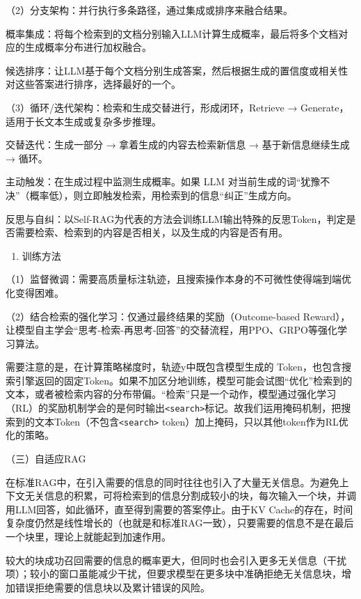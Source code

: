 （2）分支架构：并行执行多条路径，通过集成或排序来融合结果。

概率集成：将每个检索到的文档分别输入LLM计算生成概率，最后将多个文档对应的生成概率分布进行加权融合。

候选排序：让LLM基于每个文档分别生成答案，然后根据生成的置信度或相关性对这些答案进行排序，选择最好的一个。

（3）循环/迭代架构：检索和生成交替进行，形成闭环，Retrieve → Generate，适用于长文本生成或复杂多步推理。

交替迭代：生成一部分 → 拿着生成的内容去检索新信息 → 基于新信息继续生成 → 循环。

主动触发：在生成过程中监测生成概率。如果 LLM 对当前生成的词``犹豫不决''（概率低），则立即触发检索，用检索到的信息``纠正''生成方向。

反思与自纠：以Self-RAG为代表的方法会训练LLM输出特殊的反思Token，判定是否需要检索、检索到的内容是否相关，以及生成的内容是否有用。

\begin{enumerate}
\def\labelenumi{\arabic{enumi}.}
\setcounter{enumi}{1}
\tightlist
\item
  训练方法
\end{enumerate}

（1）监督微调：需要高质量标注轨迹，且搜索操作本身的不可微性使得端到端优化变得困难。

（2）结合检索的强化学习：仅通过最终结果的奖励（Outcome-based Reward），让模型自主学会``思考-检索-再思考-回答''的交替流程，用PPO、GRPO等强化学习算法。

需要注意的是，在计算策略梯度时，轨迹y中既包含模型生成的 Token，也包含搜索引擎返回的固定Token。如果不加区分地训练，模型可能会试图``优化''检索到的文本，或者被检索内容的分布带偏。``检索''只是一个动作，模型通过强化学习（RL）的奖励机制学会的是何时输出\texttt{\textless{}search\textgreater{}}标记。故我们运用掩码机制，把搜索到的文本Token（不包含\texttt{\textless{}search\textgreater{}} token）加上掩码，只以其他token作为RL优化的策略。

（三）自适应RAG

在标准RAG中，在引入需要的信息的同时往往也引入了大量无关信息。为避免上下文无关信息的积累，可将检索到的信息分割成较小的块，每次输入一个块，并调用LLM回答，如此循环，直至得到需要的答案停止。由于KV Cache的存在，时间复杂度仍然是线性增长的（也就是和标准RAG一致），只要需要的信息不是在最后一个块里，理论上就能起到加速作用。

较大的块成功召回需要的信息的概率更大，但同时也会引入更多无关信息（干扰项）；较小的窗口虽能减少干扰，但要求模型在更多块中准确拒绝无关信息块，增加错误拒绝需要的信息块以及累计错误的风险。

